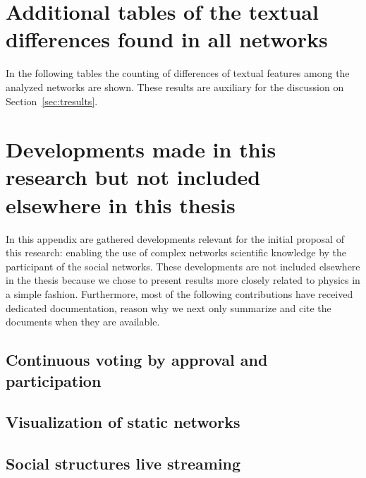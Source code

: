 
\begin{apendicesenv}
	\partapendices
	\chapter{Additional tables of the textual differences found in all networks}\label{ap:textd}
In the following tables the counting of differences of textual features among the analyzed networks
are shown.
	These results are auxiliary for the discussion on Section~\ref{sec:tresults}.
\FloatBarrier











\chapter{Developments made in this research but not included elsewhere in this thesis}\label{ap:vot}
In this appendix are gathered developments relevant for the initial proposal of this research:
enabling the use of complex networks scientific knowledge by the participant of the social networks.
These developments are not included elsewhere in the thesis because we chose to present results
more closely related to physics in a simple fashion.
Furthermore, most of the following contributions have received dedicated documentation,
reason why we next only summarize and cite the documents when they are available.

\section{Continuous voting by approval and participation}

\section{Visualization of static networks}
\section{Social structures live streaming}

\end{apendicesenv}
